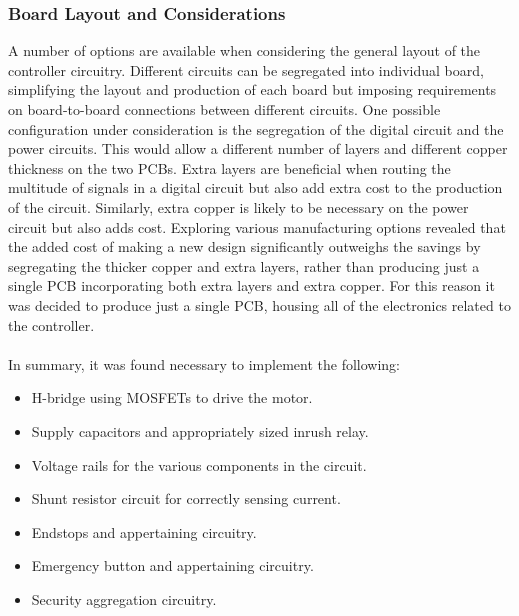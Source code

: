 \subsubsection{Board Layout and Considerations} %
\label{ssub:board_layout_and_considerations}
A number of options are available when considering the general layout of the controller circuitry.
Different circuits can be segregated into individual board, simplifying the layout and production of each board but imposing requirements on board-to-board connections between different circuits.
One possible configuration under consideration is the segregation of the digital circuit and the power circuits.
This would allow a different number of layers and different copper thickness on the two PCBs.
Extra layers are beneficial when routing the multitude of signals in a digital circuit but also add extra cost to the production of the circuit.
Similarly, extra copper is likely to be necessary on the power circuit but also adds cost.
Exploring various manufacturing options revealed that the added cost of making a new design significantly outweighs the savings by segregating the thicker copper and extra layers, rather than producing just a single PCB incorporating both extra layers and extra copper.
For this reason it was decided to produce just a single PCB, housing all of the electronics related to the controller.
\\~\\
In summary, it was found necessary to implement the following:
\begin{itemize}
	\item H-bridge using MOSFETs to drive the motor.
	\item Supply capacitors and appropriately sized inrush relay.
	\item Voltage rails for the various components in the circuit.
	\item Shunt resistor circuit for correctly sensing current.
	\item Endstops and appertaining circuitry.
	\item Emergency button and appertaining circuitry.
	\item Security aggregation circuitry.
\end{itemize}
